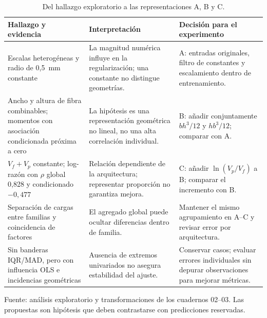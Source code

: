 \begin{table}[htbp]
\centering\small{}
\caption{Del hallazgo exploratorio a las representaciones A, B y C.}
\label{tab:puente-fe}
\begin{tabularx}{\linewidth}{@{}YYY@{}}
\toprule
Hallazgo y evidencia & Interpretación & Decisión para el experimento \\
\midrule
Escalas heterogéneas y radio de 0,5~mm constante & La magnitud numérica influye en la regularización; una constante no distingue geometrías. & A: entradas originales, filtro de constantes y escalamiento dentro de entrenamiento. \\
\addlinespace
Ancho y altura de fibra combinables; momentos con asociación condicionada próxima a cero & La hipótesis es una representación geométrica no lineal, no una alta correlación individual. & B: añadir conjuntamente $bh^3/12$ y $hb^3/12$; comparar con A. \\
\addlinespace
$V_f+V_p$ constante; log-razón con $\rho$ global 0,828 y condicionado $-0,477$ & Relación dependiente de la arquitectura; representar proporción no garantiza mejora. & C: añadir $\ln(V_p/V_f)$ a B; comparar el incremento con B. \\
\addlinespace
Separación de cargas entre familias y coincidencia de factores & El agregado global puede ocultar diferencias dentro de familia. & Mantener el mismo agrupamiento en A--C y revisar error por arquitectura. \\
\addlinespace
Sin banderas IQR/MAD, pero con influencia OLS e incidencias geométricas & Ausencia de extremos univariados no asegura estabilidad del ajuste. & Conservar casos; evaluar errores individuales sin depurar observaciones para mejorar métricas. \\
\bottomrule
\end{tabularx}
\par\smallskip\small Fuente: análisis exploratorio y transformaciones de los cuadernos 02--03. Las propuestas son hipótesis que deben contrastarse con predicciones reservadas.
\end{table}
